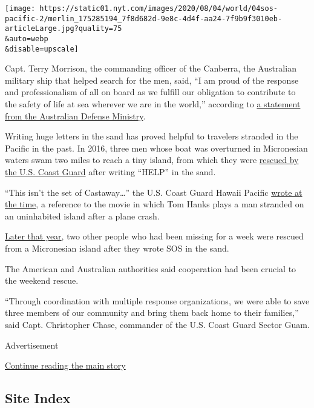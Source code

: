 \texttt{[image: https://static01.nyt.com/images/2020/08/04/world/04sos-pacific-2/merlin\_175285194\_7f8d682d-9e8c-4d4f-aa24-7f9b9f3010eb-articleLarge.jpg?quality=75\\\&auto=webp\\\&disable=upscale]}

Capt. Terry Morrison, the commanding officer of the Canberra, the
Australian military ship that helped search for the men, said, ``I am
proud of the response and professionalism of all on board as we fulfill
our obligation to contribute to the safety of life at sea wherever we
are in the world,'' according to
\href{https://news.defence.gov.au/international/hmas-canberra-assists-search-and-rescue}{a
statement from the Australian Defense Ministry}.

Writing huge letters in the sand has proved helpful to travelers
stranded in the Pacific in the past. In 2016, three men whose boat was
overturned in Micronesian waters swam two miles to reach a tiny island,
from which they were
\href{https://twitter.com/USCGHawaiiPac/status/718703857837019137?ref_src=twsrc\%5Etfw\%7Ctwcamp\%5Etweetembed\%7Ctwterm\%5E718703857837019137\%7Ctwgr\%5E\&ref_url=https\%3A\%2F\%2Fwww.theguardian.com\%2Fus-news\%2F2016\%2Fapr\%2F09\%2Fmen-rescued-help-palm-leaves-island-pacific}{rescued
by the U.S. Coast Guard} after writing ``HELP'' in the sand.

``This isn't the set of Castaway\ldots{}'' the U.S. Coast Guard Hawaii
Pacific
\href{https://www.facebook.com/USCG.Hawaii.Pacific/posts/986794331411733}{wrote
at the time}, a reference to the movie in which Tom Hanks plays a man
stranded on an uninhabited island after a plane crash.

\href{https://www.bbc.com/news/world-asia-37203796}{Later that year},
two other people who had been missing for a week were rescued from a
Micronesian island after they wrote SOS in the sand.

The American and Australian authorities said cooperation had been
crucial to the weekend rescue.

``Through coordination with multiple response organizations, we were
able to save three members of our community and bring them back home to
their families,'' said Capt. Christopher Chase, commander of the U.S.
Coast Guard Sector Guam.

Advertisement

\protect\hyperlink{after-bottom}{Continue reading the main story}

\hypertarget{site-index}{%
\subsection{Site Index}\label{site-index}}


